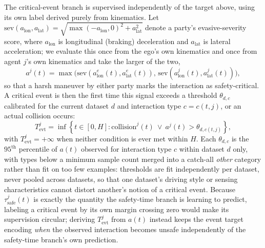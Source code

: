 \documentclass[letterpaper, 10 pt, conference]{ieeeconf}  %
\begin{document}
The critical-event branch is supervised independently of the target
above, using its own label derived purely from kinematics. Let
$\mathrm{sev}(a_{\mathrm{lon}},a_{\mathrm{lat}})=\sqrt{\max(-a_{\mathrm{lon}},0)^2+a_{\mathrm{lat}}^2}$
denote a party's evasive-severity score, where $a_{\mathrm{lon}}$ is
longitudinal (braking) deceleration and $a_{\mathrm{lat}}$ is lateral
acceleration; we evaluate this once from the ego's own kinematics and once
from agent $j$'s own kinematics and take the larger of the two,
\begin{equation*}
a^{j}(t)=\max\!\big(
\mathrm{sev}(a_{\mathrm{lon}}^{e}(t),a_{\mathrm{lat}}^{e}(t)),\,
\mathrm{sev}(a_{\mathrm{lon}}^{j}(t),a_{\mathrm{lat}}^{j}(t))
\big),
\end{equation*}
so that a harsh maneuver by either party marks the interaction as
safety-critical. A
critical event is then the first time this signal exceeds a threshold
$\theta_{d,c}$ calibrated for the current dataset $d$ and interaction type
$c=c(t,j)$, or an actual collision occurs:
\begin{equation}
T_{\mathrm{evt}}^{j}
=\inf\!\left\{t\in[0,H]:
\mathrm{collision}^{j}(t)
\ \lor\
a^{j}(t)>\theta_{d,c(t,j)}\right\},
\label{eq:carm_critical_event}
\end{equation}
with $T_{\mathrm{evt}}^j=+\infty$ when neither condition is ever met within
$H$. Each $\theta_{d,c}$ is the $95^{\mathrm{th}}$ percentile of $a(t)$
observed for interaction type $c$ within dataset $d$ only, with types
below a minimum sample count merged into a catch-all \emph{other}
category rather than fit on too few examples: thresholds are fit
independently per dataset, never pooled across datasets, so that one
dataset's driving style or sensing characteristics cannot distort
another's notion of a critical event. Because $\tau_{\mathrm{safe}}^{j}(t)$
is exactly the quantity the safety-time branch is learning to predict,
labeling a critical event by its own margin crossing zero would make its
supervision circular; deriving $T_{\mathrm{evt}}^j$ from $a(t)$ instead
keeps the event target encoding \emph{when} the observed interaction
becomes unsafe independently of the safety-time branch's own prediction.
\end{document}

